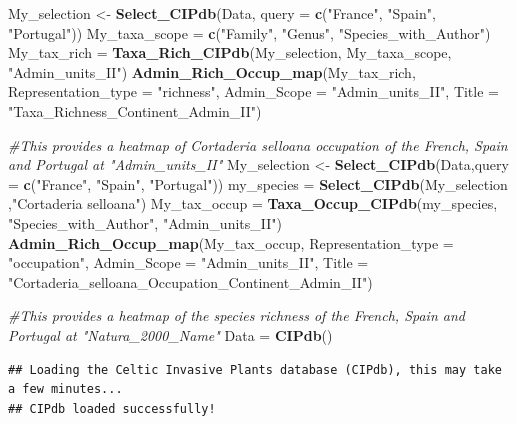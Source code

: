 \documentclass[
]{article}
\newenvironment{Shaded}{\begin{snugshade}}{\end{snugshade}}
\newcommand{\AttributeTok}[1]{\textcolor[rgb]{0.13,0.29,0.53}{#1}}
\newcommand{\CommentTok}[1]{\textcolor[rgb]{0.56,0.35,0.01}{\textit{#1}}}
\newcommand{\FunctionTok}[1]{\textcolor[rgb]{0.13,0.29,0.53}{\textbf{#1}}}
\newcommand{\NormalTok}[1]{#1}
\newcommand{\OtherTok}[1]{\textcolor[rgb]{0.56,0.35,0.01}{#1}}
\newcommand{\StringTok}[1]{\textcolor[rgb]{0.31,0.60,0.02}{#1}}
\begin{document}
\begin{Shaded}
\begin{Highlighting}[]
\NormalTok{My\_selection }\OtherTok{\textless{}{-}} \FunctionTok{Select\_CIPdb}\NormalTok{(Data, }\AttributeTok{query =} \FunctionTok{c}\NormalTok{(}\StringTok{"France"}\NormalTok{, }\StringTok{"Spain"}\NormalTok{, }\StringTok{"Portugal"}\NormalTok{))}
\NormalTok{My\_taxa\_scope }\OtherTok{=} \FunctionTok{c}\NormalTok{(}\StringTok{"Family"}\NormalTok{, }\StringTok{"Genus"}\NormalTok{, }\StringTok{"Species\_with\_Author"}\NormalTok{)}
\NormalTok{My\_tax\_rich }\OtherTok{=} \FunctionTok{Taxa\_Rich\_CIPdb}\NormalTok{(My\_selection, My\_taxa\_scope, }\StringTok{"Admin\_units\_II"}\NormalTok{)}
\FunctionTok{Admin\_Rich\_Occup\_map}\NormalTok{(My\_tax\_rich, }\AttributeTok{Representation\_type =} \StringTok{"richness"}\NormalTok{, }\AttributeTok{Admin\_Scope =} \StringTok{"Admin\_units\_II"}\NormalTok{, }\AttributeTok{Title =} \StringTok{"Taxa\_Richness\_Continent\_Admin\_II"}\NormalTok{)}

\CommentTok{\#This provides a heatmap of  Cortaderia selloana occupation  of the French, Spain and Portugal at "Admin\_units\_II"}
\NormalTok{My\_selection }\OtherTok{\textless{}{-}} \FunctionTok{Select\_CIPdb}\NormalTok{(Data,}\AttributeTok{query =} \FunctionTok{c}\NormalTok{(}\StringTok{"France"}\NormalTok{, }\StringTok{"Spain"}\NormalTok{, }\StringTok{"Portugal"}\NormalTok{))}
\NormalTok{my\_species }\OtherTok{=} \FunctionTok{Select\_CIPdb}\NormalTok{(My\_selection ,}\StringTok{"Cortaderia selloana"}\NormalTok{)}
\NormalTok{My\_tax\_occup }\OtherTok{=} \FunctionTok{Taxa\_Occup\_CIPdb}\NormalTok{(my\_species, }\StringTok{"Species\_with\_Author"}\NormalTok{, }\StringTok{"Admin\_units\_II"}\NormalTok{)}
\FunctionTok{Admin\_Rich\_Occup\_map}\NormalTok{(My\_tax\_occup, }\AttributeTok{Representation\_type =} \StringTok{"occupation"}\NormalTok{, }\AttributeTok{Admin\_Scope =} \StringTok{"Admin\_units\_II"}\NormalTok{, }\AttributeTok{Title =} \StringTok{"Cortaderia\_selloana\_Occupation\_Continent\_Admin\_II"}\NormalTok{)}

\CommentTok{\#This provides a heatmap of the species richness of the French, Spain and Portugal at "Natura\_2000\_Name"}
\NormalTok{Data }\OtherTok{=} \FunctionTok{CIPdb}\NormalTok{()}
\end{Highlighting}
\end{Shaded}

\begin{verbatim}
## Loading the Celtic Invasive Plants database (CIPdb), this may take a few minutes...
## CIPdb loaded successfully!
\end{verbatim}
\end{document}
